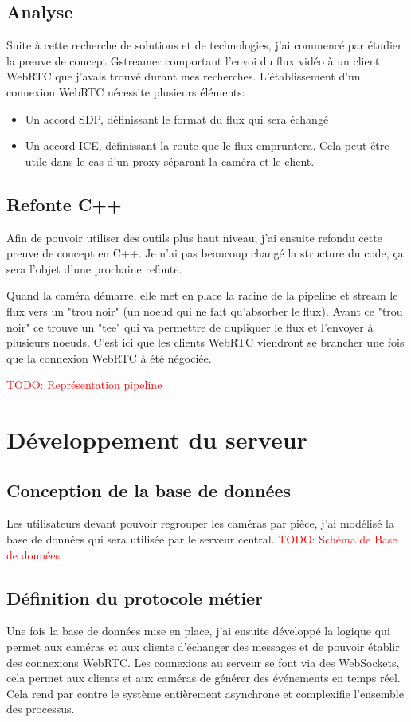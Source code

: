 \documentclass[12pt, a4paper]{report}
\makeatletter
\newcommand\TODO[1]{\textcolor{red}{TODO\@: #1}}
\makeatother
\begin{document}
\subsection{Analyse}
Suite à cette recherche de solutions et de technologies, j'ai commencé par étudier la preuve de concept Gstreamer comportant l'envoi du flux vidéo à un client WebRTC que j'avais trouvé durant mes recherches.\newline
L'établissement d'un connexion WebRTC nécessite plusieurs éléments:
\begin{itemize}
    \item Un accord SDP, définissant le format du flux qui sera échangé
    \item Un accord ICE, définissant la route que le flux empruntera. Cela peut être utile dans le cas d'un proxy séparant la caméra et le client.
\end{itemize}
\subsection{Refonte C++}
Afin de pouvoir utiliser des outils plus haut niveau, j'ai ensuite refondu cette preuve de concept en C++.\newline
Je n'ai pas beaucoup changé la structure du code, ça sera l'objet d'une prochaine refonte.

Quand la caméra démarre, elle met en place la racine de la pipeline et stream le flux vers un "trou noir" (un noeud qui ne fait qu'absorber le flux). Avant ce "trou noir" ce trouve un "tee" qui va permettre de dupliquer le flux et l'envoyer à plusieurs noeuds. C'est ici que les clients WebRTC viendront se brancher une fois que la connexion WebRTC à été négociée.

\TODO{Représentation pipeline}

\section{Développement du serveur}
\subsection{Conception de la base de données}
Les utilisateurs devant pouvoir regrouper les caméras par pièce, j'ai modélisé la base de données qui sera utilisée par le serveur central.
\TODO{Schéma de Base de données}

\subsection{Définition du protocole métier}
Une fois la base de données mise en place, j'ai ensuite développé la logique qui permet aux caméras et aux clients d'échanger des messages et de pouvoir établir des connexions WebRTC.\newline
Les connexions au serveur se font via des WebSockets, cela permet aux clients et aux caméras de générer des événements en temps réel.\newline
Cela rend par contre le système entièrement asynchrone et complexifie l'ensemble des processus.\newline
\end{document}
